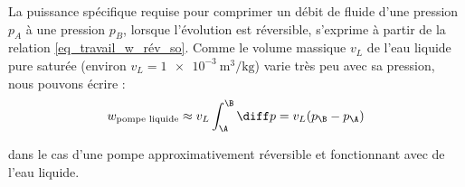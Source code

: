 		La puissance spécifique requise pour comprimer un débit de fluide d’une pression $p_A$ à une pression $p_B$, lorsque l’évolution est réversible, s’exprime à partir de la relation \ref{eq_travail_w_rév_so}. Comme le volume massique $v_L$  de l’eau liquide pure saturée (environ $v_L = \SI{1e-3}{\metre\cubed\per\kilogram}$) varie très peu avec sa pression, nous pouvons écrire :
		\begin{equation}
			w_\text{pompe~liquide} \approx v_L \int_\A^\B \diff p = v_L (p_\B - p_\A ) \label{eq_pompe_liquide}
		\end{equation}
		\begin{description}
			\item dans le cas d’une pompe approximativement réversible et fonctionnant avec de l’eau liquide.
		\end{description}

